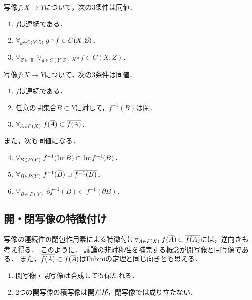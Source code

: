 \documentclass[uplatex,dvipdfmx]{jsreport}
\begin{document}
\begin{theorem}[圏論的特徴付け]
    写像$f:X\to Y$について，次の3条件は同値．
    \begin{enumerate}
        \item $f$は連続である．
        \item $\forall_{g\in C(Y;\mathbb{S})}\;g\circ f\in C(X;\mathbb{S})$．
        \item $\forall_{Z\in\Top}\;\forall_{g\in C(Y;Z)}\;g\circ f\in C(X;Z)$．
    \end{enumerate}
\end{theorem}

\begin{proposition}[閉集合と閉包による特徴付け]
    写像$f:X\to Y$について，次の3条件は同値．
    \begin{enumerate}
        \item $f$は連続である．
        \item 任意の閉集合$B\subset Y$に対して，$f^{-1}(B)$は閉．
        \item $\forall_{A\in P(X)}\;f(\overline{A})\subset\overline{f(A)}$．
    \end{enumerate}
    また，次も同値になる．
    \begin{enumerate}\setcounter{enumi}{3}
        \item $\forall_{B\in P(Y)}\;f^{-1}(\mathrm{Int} B)\subset\mathrm{Int} f^{-1}(B)$．
        \item $\forall_{B\in P(Y)}\;f^{-1}(\overline{B})\supset\overline{f^{-1}(B)}$．
        \item $\forall_{B\in P(Y)}\;\partial f^{-1}(B)\subset f^{-1}(\partial B)$．
    \end{enumerate}
\end{proposition}

\subsection{開・閉写像の特徴付け}

\begin{tcolorbox}[colframe=ForestGreen, colback=ForestGreen!10!white,breakable,colbacktitle=ForestGreen!40!white,coltitle=black,fonttitle=\bfseries\sffamily,
title=]
    写像の連続性の閉包作用素による特徴付け$\forall_{A\in P(X)}\;f(\overline{A})\subset\overline{f(A)}$には，逆向きも考え得る．
    このように，
    議論の非対称性を補完する概念が開写像と閉写像である．
    また，$\overline{f(A)}\subset f(\overline{A})$はFubiniの定理と同じ向きとも思える．
\end{tcolorbox}

\begin{lemma}\mbox{}
    \begin{enumerate}
        \item 開写像・閉写像は合成しても保たれる．
        \item 2つの開写像の積写像は開だが，閉写像では成り立たない．
    \end{enumerate}
\end{lemma}
\end{document}
